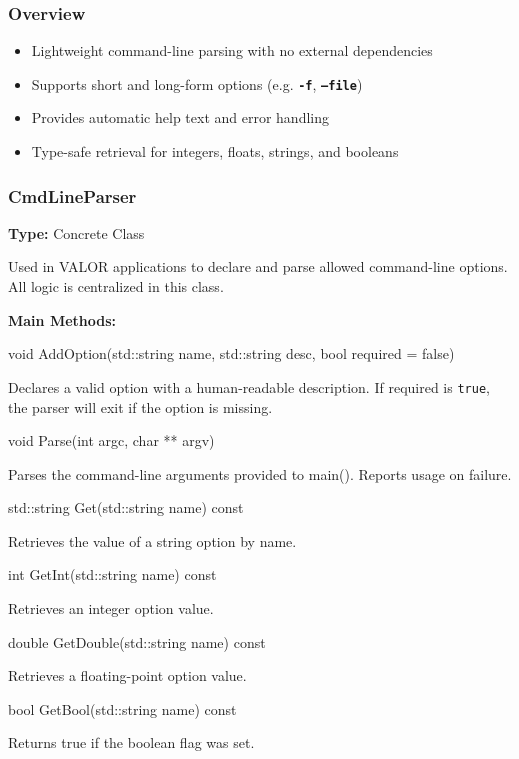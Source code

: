 \subsubsection*{Overview}

\begin{itemize}
  \item Lightweight command-line parsing with no external dependencies
  \item Supports short and long-form options (e.g. {\bf \tt -f}, {\bf \tt --file})
  \item Provides automatic help text and error handling
  \item Type-safe retrieval for integers, floats, strings, and booleans
\end{itemize}

\vspace{1em}
\subsubsection*{\color{cadmiumgreen} \bf CmdLineParser}

\textbf{Type:} Concrete Class

Used in VALOR applications to declare and parse allowed command-line options.  
All logic is centralized in this class.

\vspace{0.5em}
\noindent\textbf{Main Methods:}

\begin{description}[align=left]

  \item[] {\color{cadmiumred} void AddOption(std::string name, std::string desc, bool required = false)}

  Declares a valid option with a human-readable description.  
  If {\color{amber}required} is {\tt true}, the parser will exit if the option is missing.

  \item[] {\color{cadmiumred} void Parse(int argc, char ** argv)}

  Parses the command-line arguments provided to {\color{cadmiumgreen} main()}.  
  Reports usage on failure.

  \item[] {\color{cadmiumred} std::string Get(std::string name) const}

  Retrieves the value of a string option by name.

  \item[] {\color{cadmiumred} int GetInt(std::string name) const}

  Retrieves an integer option value.

  \item[] {\color{cadmiumred} double GetDouble(std::string name) const}

  Retrieves a floating-point option value.

  \item[] {\color{cadmiumred} bool GetBool(std::string name) const}

  Returns true if the boolean flag was set.

\end{description}

